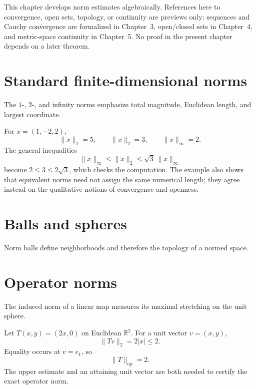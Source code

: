 \begin{remark}
This chapter develops norm estimates algebraically. References here to convergence,
open sets, topology, or continuity are previews only: sequences and Cauchy
convergence are formalized in Chapter~3, open/closed sets in Chapter~4, and
metric-space continuity in Chapter~5. No proof in the present chapter depends
on a later theorem.
\end{remark}

\section{Standard finite-dimensional norms}
The $1$-, $2$-, and infinity norms emphasize total magnitude, Euclidean length, and largest coordinate.


\begin{example}\label{ex:ii02-expand-01}
For \(x=(1,-2,2)\),
\[
\|x\|_1=5,\qquad \|x\|_2=3,\qquad \|x\|_\infty=2.
\]
The general inequalities
\[
\|x\|_\infty\le\|x\|_2\le\sqrt3\,\|x\|_\infty
\]
become \(2\le3\le2\sqrt3\), which checks the computation. The example also
shows that equivalent norms need not assign the same numerical length; they
agree instead on the qualitative notions of convergence and openness.
\end{example}
\section{Balls and spheres}
Norm balls define neighborhoods and therefore the topology of a normed space.

\section{Operator norms}
The induced norm of a linear map measures its maximal stretching on the unit sphere.


\begin{example}\label{ex:ii02-expand-02}
Let \(T(x,y)=(2x,0)\) on Euclidean \(\mathbb R^2\). For a unit vector
\(v=(x,y)\),
\[
\|Tv\|_2=2|x|\le2.
\]
Equality occurs at \(v=e_1\), so
\[
\|T\|_{\mathrm{op}}=2.
\]
The upper estimate and an attaining unit vector are both needed to certify the
exact operator norm.
\end{example}
